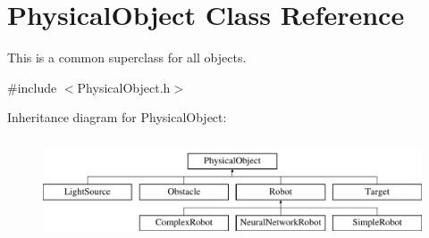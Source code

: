 \hypertarget{classPhysicalObject}{\section{Physical\-Object Class Reference}
\label{classPhysicalObject}
}


This is a common superclass for all objects.  




{\ttfamily \#include $<$Physical\-Object.\-h$>$}

Inheritance diagram for Physical\-Object\-:\begin{figure}[H]
\begin{center}
\leavevmode
\includegraphics[height=3.000000cm]{classPhysicalObject}
\end{center}
\end{figure}
